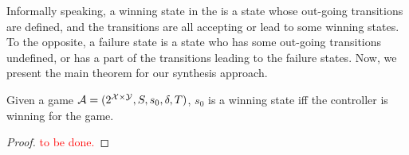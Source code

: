 Informally speaking, a winning state in the \tdfa is a state whose out-going transitions are defined, and the transitions are all accepting or lead to some winning states. To the opposite, a failure state is a state who has some out-going transitions undefined, or has a part of the transitions leading to the failure states. Now, we present the main theorem for our synthesis approach. 

\begin{theorem}\label{thm:winning-and-failure}
Given a \tdfa game $\mathcal{A} =(2^{\mathcal{X}\times \mathcal{Y}},S,s_0,\delta,T)$, $s_0$ is a winning state iff the controller is winning for the game.

\end{theorem}
\begin{proof}
\textcolor{red}{to be done.}
\end{proof}




